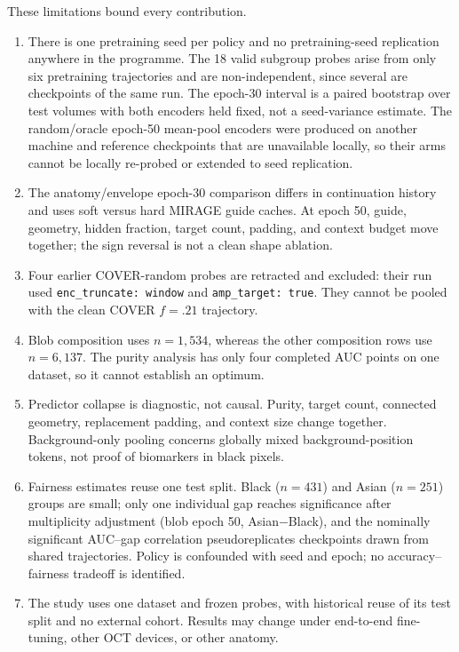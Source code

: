 \documentclass{article}
\begin{document}
These limitations bound every contribution.
\begin{enumerate}
  \item There is one pretraining seed per policy and no pretraining-seed
  replication anywhere in the programme. The 18 valid subgroup probes arise
  from only six pretraining trajectories and are non-independent, since several
  are checkpoints of the same run. The epoch-30 interval is a paired bootstrap
  over test volumes with both encoders held fixed, not a seed-variance
  estimate. The random/oracle epoch-50 mean-pool encoders were produced on
  another machine and reference checkpoints that are unavailable locally, so
  their arms cannot be locally re-probed or extended to seed replication.
  \item The anatomy/envelope epoch-30 comparison differs in continuation
  history and uses soft versus hard MIRAGE guide caches. At epoch 50, guide,
  geometry, hidden fraction, target count, padding, and context budget move
  together; the sign reversal is not a clean shape ablation.
  \item Four earlier COVER-random probes are retracted and excluded: their run
  used \texttt{enc\_truncate: window} and \texttt{amp\_target: true}. They
  cannot be pooled with the clean COVER $f=.21$ trajectory.
  \item Blob composition uses $n=1{,}534$, whereas the other composition rows
  use $n=6{,}137$. The purity analysis has only four completed AUC points on
  one dataset, so it cannot establish an optimum.
  \item Predictor collapse is diagnostic, not causal. Purity, target count,
  connected geometry, replacement padding, and context size change together.
  Background-only pooling concerns globally mixed background-position tokens,
  not proof of biomarkers in black pixels.
  \item Fairness estimates reuse one test split. Black ($n=431$) and Asian
  ($n=251$) groups are small; only one individual gap reaches significance
  after multiplicity adjustment (blob epoch 50, Asian$-$Black), and the
  nominally significant AUC--gap correlation pseudoreplicates checkpoints
  drawn from shared trajectories. Policy is confounded with seed and
  epoch; no accuracy--fairness tradeoff is identified.
  \item The study uses one dataset and frozen probes, with historical reuse of
  its test split and no external cohort. Results may change under end-to-end
  fine-tuning, other OCT devices, or other anatomy.
\end{enumerate}
\end{document}
